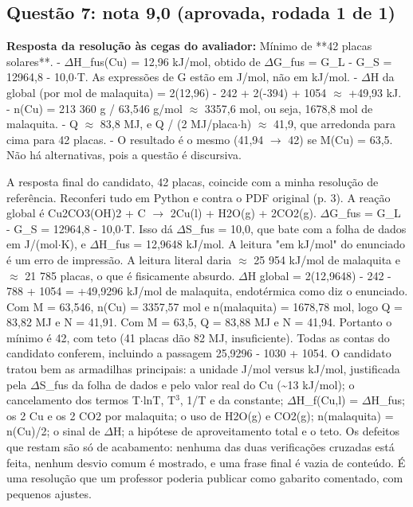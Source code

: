 \documentclass{article}%
\begin{document}
\subsection*{Questão 7: nota 9,0 (aprovada, rodada 1 de 1)}%
\textbf{Resposta da resolução às cegas do avaliador:} Mínimo de **42 placas solares**.\newline%
\newline%
{-} $\Delta$H\_fus(Cu) = 12,96 kJ/mol, obtido de $\Delta$G\_fus = G\_L - G\_S = 12964,8 - 10,0$\cdot$T. As expressões de G estão em J/mol, não em kJ/mol.\newline%
{-} $\Delta$H da global (por mol de malaquita) = 2(12,96) - 242 + 2(-394) + 1054 $\approx$ +49,93 kJ.\newline%
{-} n(Cu) = 213 360 g / 63,546 g/mol $\approx$ 3357,6 mol, ou seja, 1678,8 mol de malaquita.\newline%
{-} Q $\approx$ 83,8 MJ, e Q / (2 MJ/placa$\cdot$h) $\approx$ 41,9, que arredonda para cima para 42 placas.\newline%
{-} O resultado é o mesmo (41,94 $\to$ 42) se M(Cu) = 63,5. Não há alternativas, pois a questão é discursiva.\par %
A resposta final do candidato, 42 placas, coincide com a minha resolução de referência. Reconferi tudo em Python e contra o PDF original (p. 3). A reação global é Cu2CO3(OH)2 + C $\to$ 2Cu(l) + H2O(g) + 2CO2(g). $\Delta$G\_fus = G\_L - G\_S = 12964,8 - 10,0$\cdot$T. Isso dá $\Delta$S\_fus = 10,0, que bate com a folha de dados em J/(mol$\cdot$K), e $\Delta$H\_fus = 12,9648 kJ/mol. A leitura "em kJ/mol" do enunciado é um erro de impressão. A leitura literal daria $\approx$ 25 954 kJ/mol de malaquita e $\approx$ 21 785 placas, o que é fisicamente absurdo. $\Delta$H global = 2(12,9648) - 242 - 788 + 1054 = +49,9296 kJ/mol de malaquita, endotérmica como diz o enunciado. Com M = 63,546, n(Cu) = 3357,57 mol e n(malaquita) = 1678,78 mol, logo Q = 83,82 MJ e N = 41,91. Com M = 63,5, Q = 83,88 MJ e N = 41,94. Portanto o mínimo é 42, com teto (41 placas dão 82 MJ, insuficiente). Todas as contas do candidato conferem, incluindo a passagem 25,9296 - 1030 + 1054. O candidato tratou bem as armadilhas principais: a unidade J/mol versus kJ/mol, justificada pela $\Delta$S\_fus da folha de dados e pelo valor real do Cu (\textasciitilde{}13 kJ/mol); o cancelamento dos termos T$\cdot$lnT, T$^3$, 1/T e da constante; $\Delta$H\_f(Cu,l) = $\Delta$H\_fus; os 2 Cu e os 2 CO2 por malaquita; o uso de H2O(g) e CO2(g); n(malaquita) = n(Cu)/2; o sinal de $\Delta$H; a hipótese de aproveitamento total e o teto. Os defeitos que restam são só de acabamento: nenhuma das duas verificações cruzadas está feita, nenhum desvio comum é mostrado, e uma frase final é vazia de conteúdo. É uma resolução que um professor poderia publicar como gabarito comentado, com pequenos ajustes.%
\end{document}
